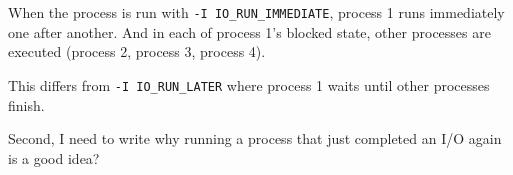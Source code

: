 \documentclass[12pt]{article}
\begin{document}
\begin{enumerate}[1.]
    \bigskip

    When the process is run with \texttt{-I IO\_RUN\_IMMEDIATE}, process 1 runs immediately one after another.
    And in each of process 1's blocked state, other processes are executed (process 2, process 3, process 4).

    \bigskip

    This differs from \texttt{-I IO\_RUN\_LATER} where process 1
    waits until other processes finish.

    \bigskip

    Second, I need to write why running a process that just completed an I/O again is
    a good idea?


\end{enumerate}
\end{document}
